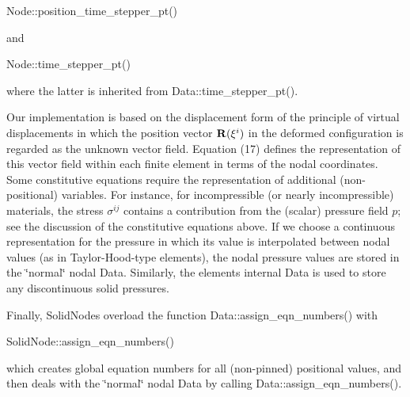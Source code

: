 \begin{DoxyItemize}
\begin{DoxyCode}
Node::position\_time\_stepper\_pt()
\end{DoxyCode}
 and 
\begin{DoxyCode}
Node::time\_stepper\_pt()
\end{DoxyCode}
 where the latter is inherited from {\ttfamily Data\+::time\+\_\+stepper\+\_\+pt()}.
\item Our implementation is based on the displacement form of the principle of virtual displacements in which the position vector $ {\bf R}(\xi^i) $ in the deformed configuration is regarded as the unknown vector field. Equation (17) defines the representation of this vector field within each finite element in terms of the nodal coordinates. Some constitutive equations require the representation of additional (non-\/positional) variables. For instance, for incompressible (or nearly incompressible) materials, the stress $ \sigma^{ij} $ contains a contribution from the (scalar) pressure field $ p $; see the discussion of the constitutive equations above. If we choose a continuous representation for the pressure in which its value is interpolated between nodal values (as in Taylor-\/\+Hood-\/type elements), the nodal pressure values are stored in the \char`\"{}normal\char`\"{} nodal {\ttfamily Data}. Similarly, the elements\textquotesingle{} internal {\ttfamily Data} is used to store any discontinuous solid pressures.
\item Finally, {\ttfamily Solid\+Nodes} overload the function {\ttfamily Data\+::assign\+\_\+eqn\+\_\+numbers()} with 
\begin{DoxyCode}
SolidNode::assign\_eqn\_numbers()
\end{DoxyCode}
 which creates global equation numbers for all (non-\/pinned) positional values, and then deals with the \char`\"{}normal\char`\"{} nodal {\ttfamily Data} by calling {\ttfamily Data\+::assign\+\_\+eqn\+\_\+numbers()}.
\end{DoxyItemize}

